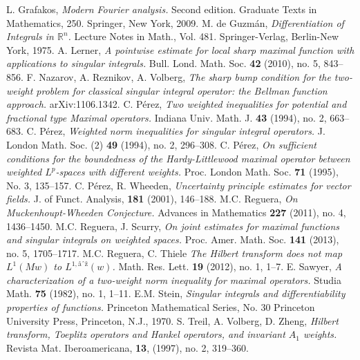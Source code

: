 \documentclass[11pt]{amsart}
\theoremstyle{definition}
\begin{document}
\begin{thebibliography}{00}
 L. Grafakos, \emph{Modern Fourier analysis.} Second edition. Graduate Texts in Mathematics, 250. Springer, New York, 2009.
 M. de Guzm\'an, \emph{Differentiation of Integrals in ${\mathbb{R}}^n$.} Lecture Notes in Math., Vol. 481. Springer-Verlag, Berlin-New York, 1975.
 A. Lerner, \emph{A pointwise estimate for local sharp maximal function with applications to singular integrals.}  Bull. Lond. Math. Soc. \textbf{42} (2010), no. 5, 843--856.
 F. Nazarov, A. Reznikov, A. Volberg, \emph{The sharp bump condition for the two-weight problem for classical singular integral operator: the Bellman function approach.} arXiv:1106.1342.
 C. P\'erez, \emph{Two weighted inequalities for potential and fractional type Maximal operators.}  Indiana Univ. Math. J. \textbf{43} (1994), no. 2, 663--683.
 C. P\'erez, \emph{Weighted norm inequalities for singular integral operators.}  J. London Math. Soc. (2) \textbf{49} (1994), no. 2, 296--308.
 C. P\'erez, \emph{On sufficient conditions for the boundedness of the Hardy-Littlewood maximal operator between weighted $L^p$-spaces with different weights.} Proc. London Math. Soc. \textbf{71} (1995), No. 3, 135--157.
 C. P\'erez, R. Wheeden, \emph{Uncertainty principle estimates for vector fields.} J. of Funct. Analysis, \textbf{181} (2001), 146--188.
 M.C. Reguera, \emph{On Muckenhoupt-Wheeden Conjecture.} Advances in Mathematics \textbf{227} (2011), no. 4, 1436--1450.
 M.C. Reguera, J. Scurry, \emph{On joint estimates for maximal functions and singular integrals on weighted spaces.} Proc. Amer. Math. Soc. \textbf{141} (2013), no. 5, 1705--1717.
 M.C. Reguera, C. Thiele \emph{The Hilbert transform does not map $L^1(Mw)$ to $L^{1,â}(w)$.} Math. Res. Lett. \textbf{19} (2012), no. 1, 1--7.
 E. Sawyer, \emph{A characterization of a two-weight norm inequality for maximal operators.} Studia Math. \textbf{75} (1982), no. 1, 1--11.
 E.M. Stein, \emph{Singular integrals and differentiability properties of functions.} Princeton Mathematical Series, No. 30 Princeton University Press, Princeton, N.J., 1970.
 S. Treil, A. Volberg, D. Zheng, \emph{Hilbert transform, Toeplitz operators and Hankel operators,
and invariant $A_1$ weights.} Revista Mat. Iberoamericana, \textbf{13}, (1997), no. 2, 319--360.

\end{thebibliography}
\end{document}
